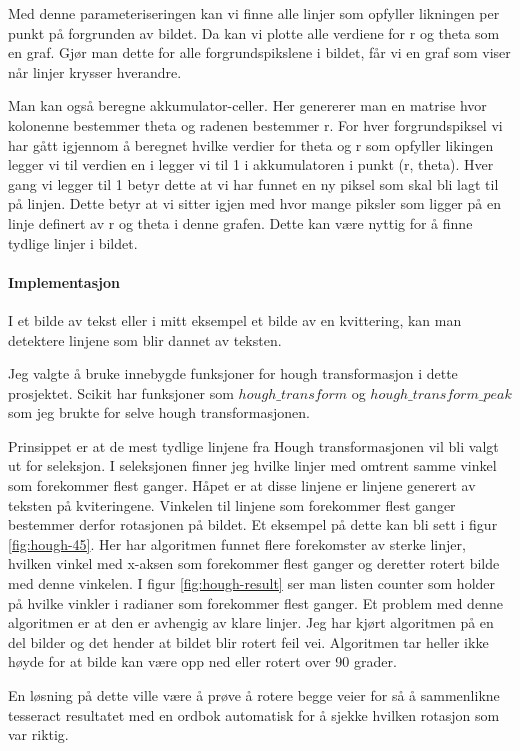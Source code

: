 \documentclass{article}
\begin{document}
Med denne parameteriseringen kan vi finne alle linjer som opfyller likningen per punkt på forgrunden av bildet. Da kan vi plotte alle verdiene for r og theta som en graf. Gjør man dette for alle forgrundspikslene i bildet, får vi en graf som viser når linjer krysser hverandre.

Man kan også beregne akkumulator-celler. Her genererer man en matrise hvor kolonenne bestemmer theta og radenen bestemmer r. For hver forgrundspiksel vi har gått igjennom å beregnet hvilke verdier for theta og r som opfyller likingen legger vi til verdien en i legger vi til 1 i akkumulatoren i punkt (r, theta). Hver gang vi legger til 1 betyr dette at vi har funnet en ny piksel som skal bli lagt til på linjen. Dette betyr at vi sitter igjen med hvor mange piksler som ligger på en linje definert av r og theta i denne grafen. Dette kan være nyttig for å finne tydlige linjer i bildet.

\paragraph{Implementasjon}
I et bilde av tekst eller i mitt eksempel et bilde av en kvittering, kan man detektere linjene som blir dannet av teksten.

Jeg valgte å bruke innebygde funksjoner for hough transformasjon i dette prosjektet. Scikit har funksjoner som $hough\_transform$ og $hough\_transform\_peak$ som jeg brukte for selve hough transformasjonen.

Prinsippet er at de mest tydlige linjene fra Hough transformasjonen vil bli valgt ut for seleksjon. I seleksjonen finner jeg hvilke linjer med omtrent samme vinkel som forekommer flest ganger. Håpet er at disse linjene er linjene generert av teksten på kviteringene. Vinkelen til linjene som forekommer flest ganger bestemmer derfor rotasjonen på bildet. Et eksempel på dette kan bli sett i figur \ref{fig:hough-45}. Her har algoritmen funnet flere forekomster av sterke linjer, hvilken vinkel med x-aksen som forekommer flest ganger og deretter rotert bilde med denne vinkelen. I figur \ref{fig:hough-result} ser man listen counter som holder på hvilke vinkler i radianer som forekommer flest ganger. Et problem med denne algoritmen er at den er avhengig av klare linjer. Jeg har kjørt algoritmen på en del bilder og det hender at bildet blir rotert feil vei. Algoritmen tar heller ikke høyde for at bilde kan være opp ned eller rotert over 90 grader.

En løsning på dette ville være å prøve å rotere begge veier for så å sammenlikne tesseract resultatet med en ordbok automatisk for å sjekke hvilken rotasjon som var riktig.
\end{document}
